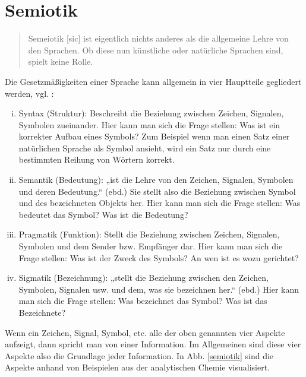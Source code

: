 \section{Semiotik}\label{}
 
\begin{quote}
 Semeiotik [sic] ist eigentlich nichts anderes als die allgemeine Lehre von den Sprachen. Ob diese nun künstliche oder natürliche Sprachen sind, spielt keine Rolle. \citep[S.~8]{Malissa}
\end{quote}
 
Die Gesetzmäßigkeiten einer Sprache kann allgemein in vier Hauptteile gegliedert werden, vgl. \citep[S.~8]{Malissa}:

 
\begin{enumerate}[(i)]

\item
Syntax (Struktur): Beschreibt die Beziehung zwischen Zeichen, Signalen, Symbolen zueinander. Hier kann man sich die Frage stellen: Was ist ein korrekter Aufbau eines Symbols? Zum Beispiel wenn man einen Satz einer natürlichen Sprache als Symbol ansieht, wird ein Satz nur durch eine bestimmten Reihung von Wörtern korrekt.


\item
Semantik (Bedeutung): „ist die Lehre von den Zeichen, Signalen, Symbolen und deren Bedeutung.“ (ebd.) Sie stellt also die Beziehung zwischen Symbol und des bezeichneten Objekts her. Hier kann man sich die Frage stellen: Was bedeutet das Symbol? Was ist die Bedeutung?


\item
Pragmatik (Funktion): Stellt die Beziehung zwischen Zeichen, Signalen, Symbolen und dem Sender bzw. Empfänger dar. Hier kann man sich die Frage stellen: Was ist der Zweck des Symbols? An wen ist es wozu gerichtet?


\item
Sigmatik (Bezeichnung): „stellt die Beziehung zwischen den Zeichen, Symbolen, Signalen usw. und dem, was sie bezeichnen her.“ (ebd.) Hier kann man sich die Frage stellen: Was bezeichnet das Symbol? Was ist das Bezeichnete?


\end{enumerate}
 
Wenn ein Zeichen, Signal, Symbol, etc. alle der oben genannten vier Aspekte aufzeigt, dann spricht man von einer Information. Im Allgemeinen sind diese vier Aspekte also die Grundlage jeder Information. In Abb. \ref{semiotik} sind die Aspekte anhand von Beispielen aus der analytischen Chemie visualisiert.

